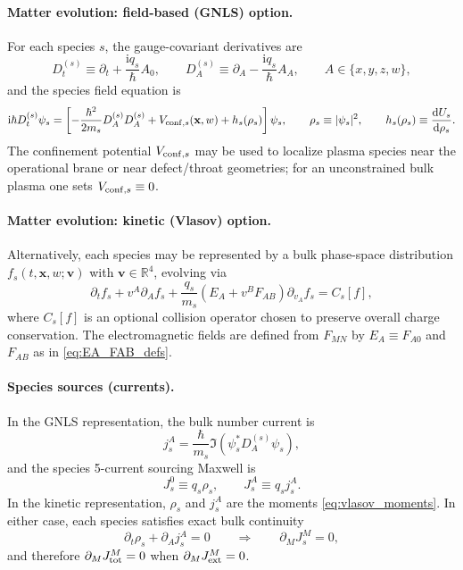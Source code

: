 \documentclass[11pt]{article}
\newcommand{\ii}{\mathrm{i}}
\newcommand{\R}{\mathbb{R}}
\newcommand{\x}{\mathbf{x}}     %
\newcommand{\F}{F}              %
\newcommand{\J}{J}              %
\newcommand{\Js}{J_s}           %
\begin{document}
\paragraph{Matter evolution: field-based (GNLS) option.}
For each species \(s\), the gauge-covariant derivatives are
\begin{equation}
D_t^{(s)} \equiv \partial_t + \frac{\ii q_s}{\hbar}A_0,
\qquad
D_A^{(s)} \equiv \partial_A - \frac{\ii q_s}{\hbar}A_A,
\qquad A\in\{x,y,z,w\},
\label{eq:covD_repeat_full}
\end{equation}
and the species field equation is
\begin{equation}
\ii\hbar D_t^{(s)}\psi_s
=
\left[
-\frac{\hbar^2}{2m_s}D_A^{(s)}D_A^{(s)}
+V_{{\rm conf},s}(\x,w)
+h_s(\rho_s)
\right]\psi_s,
\qquad
\rho_s\equiv|\psi_s|^2,
\qquad
h_s(\rho_s)\equiv \frac{\dd U_s}{\dd\rho_s}.
\label{eq:gnls_full}
\end{equation}
The confinement potential \(V_{{\rm conf},s}\) may be used to localize plasma
species near the operational brane or near defect/throat geometries; for an
unconstrained bulk plasma one sets \(V_{{\rm conf},s}\equiv 0\).

\paragraph{Matter evolution: kinetic (Vlasov) option.}
Alternatively, each species may be represented by a bulk phase-space distribution
\(f_s(t,\x,w;\mathbf{v})\) with \(\mathbf{v}\in\R^4\), evolving via
\begin{equation}
\partial_t f_s + v^A\partial_A f_s
+ \frac{q_s}{m_s}\left(E_A + v^B F_{AB}\right)\partial_{v_A} f_s
= C_s[f],
\label{eq:vlasov_full}
\end{equation}
where \(C_s[f]\) is an optional collision operator chosen to preserve overall
charge conservation. The electromagnetic fields are defined from \(\F_{MN}\) by
\(E_A\equiv F_{A0}\) and \(F_{AB}\) as in \eqref{eq:EA_FAB_defs}.

\paragraph{Species sources (currents).}
In the GNLS representation, the bulk number current is
\begin{equation}
j_s^A
=
\frac{\hbar}{m_s}\Im\!\left(\psi_s^\ast D_A^{(s)}\psi_s\right),
\label{eq:number_current_full}
\end{equation}
and the species 5-current sourcing Maxwell is
\begin{equation}
\Js^0 \equiv q_s\rho_s,
\qquad
\Js^A \equiv q_s j_s^A.
\label{eq:charge_current_full}
\end{equation}
In the kinetic representation, \(\rho_s\) and \(j_s^A\) are the moments
\eqref{eq:vlasov_moments}. In either case, each species satisfies exact bulk
continuity
\begin{equation}
\partial_t\rho_s+\partial_A j_s^A=0
\qquad\Rightarrow\qquad
\partial_M \Js^M=0,
\label{eq:species_conservation_full}
\end{equation}
and therefore \(\partial_M\J_{\rm tot}^M=0\) when \(\partial_M\J_{\rm ext}^M=0\).
\end{document}
